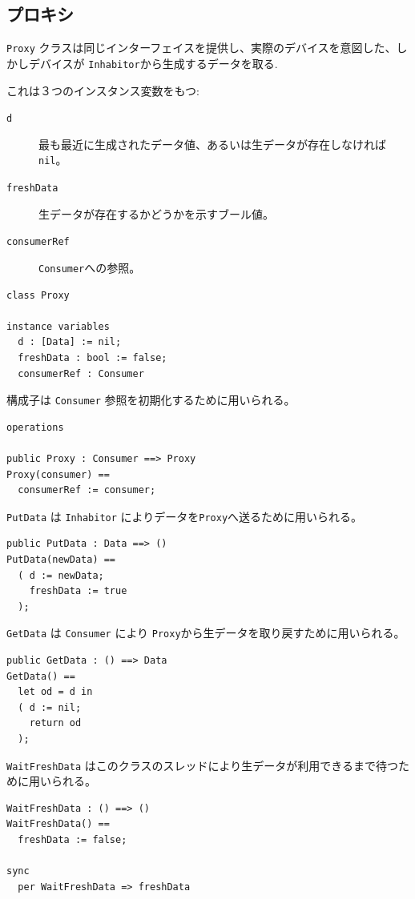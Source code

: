 \documentclass[\pformat,12pt]{jreport}
\begin{document}
\subsection{プロキシ}

 \texttt{Proxy} クラスは同じインターフェイスを提供し、実際のデバイスを意図した、しかしデバイスが \texttt{Inhabitor}から生成するデータを取る.

これは３つのインスタンス変数をもつ:

\begin{description}
\item[\texttt{d}] 最も最近に生成されたデータ値、あるいは生データが存在しなければ \texttt{nil}。
\item[\texttt{freshData}] 生データが存在するかどうかを示すブール値。
\item[\texttt{consumerRef}]  \texttt{Consumer}への参照。
\end{description}

\begin{lstlisting}
class Proxy

instance variables
  d : [Data] := nil;
  freshData : bool := false;
  consumerRef : Consumer
\end{lstlisting}

構成子は \texttt{Consumer} 参照を初期化するために用いられる。

\begin{lstlisting}
operations

public Proxy : Consumer ==> Proxy
Proxy(consumer) ==
  consumerRef := consumer;
\end{lstlisting}

\texttt{PutData} は \texttt{Inhabitor} によりデータを\texttt{Proxy}へ送るために用いられる。

\begin{lstlisting}
public PutData : Data ==> ()
PutData(newData) ==
  ( d := newData;
    freshData := true
  );
\end{lstlisting}

\texttt{GetData} は \texttt{Consumer} により \texttt{Proxy}から生データを取り戻すために用いられる。

\begin{lstlisting}
public GetData : () ==> Data
GetData() ==
  let od = d in
  ( d := nil;
    return od
  );
\end{lstlisting}

\texttt{WaitFreshData} はこのクラスのスレッドにより生データが利用できるまで待つために用いられる。

\begin{lstlisting}
WaitFreshData : () ==> ()
WaitFreshData() ==
  freshData := false;

sync
  per WaitFreshData => freshData
\end{lstlisting}
\end{document}
